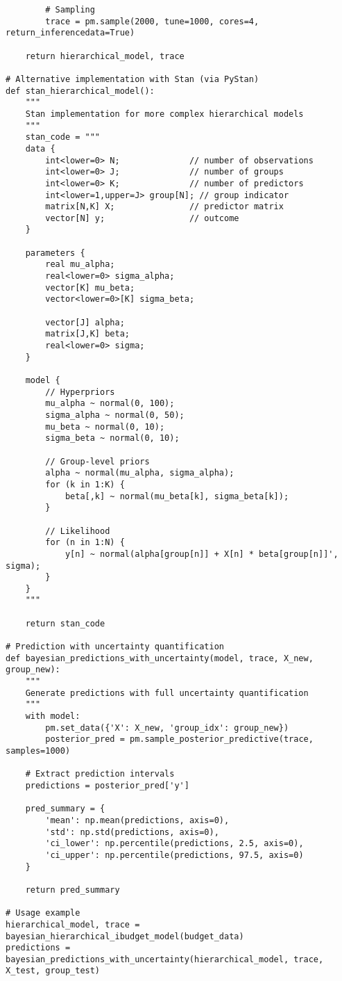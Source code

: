 \begin{lstlisting}
        # Sampling
        trace = pm.sample(2000, tune=1000, cores=4, return_inferencedata=True)
    
    return hierarchical_model, trace

# Alternative implementation with Stan (via PyStan)
def stan_hierarchical_model():
    """
    Stan implementation for more complex hierarchical models
    """
    stan_code = """
    data {
        int<lower=0> N;              // number of observations
        int<lower=0> J;              // number of groups
        int<lower=0> K;              // number of predictors
        int<lower=1,upper=J> group[N]; // group indicator
        matrix[N,K] X;               // predictor matrix
        vector[N] y;                 // outcome
    }
    
    parameters {
        real mu_alpha;
        real<lower=0> sigma_alpha;
        vector[K] mu_beta;
        vector<lower=0>[K] sigma_beta;
        
        vector[J] alpha;
        matrix[J,K] beta;
        real<lower=0> sigma;
    }
    
    model {
        // Hyperpriors
        mu_alpha ~ normal(0, 100);
        sigma_alpha ~ normal(0, 50);
        mu_beta ~ normal(0, 10);
        sigma_beta ~ normal(0, 10);
        
        // Group-level priors
        alpha ~ normal(mu_alpha, sigma_alpha);
        for (k in 1:K) {
            beta[,k] ~ normal(mu_beta[k], sigma_beta[k]);
        }
        
        // Likelihood
        for (n in 1:N) {
            y[n] ~ normal(alpha[group[n]] + X[n] * beta[group[n]]', sigma);
        }
    }
    """
    
    return stan_code

# Prediction with uncertainty quantification
def bayesian_predictions_with_uncertainty(model, trace, X_new, group_new):
    """
    Generate predictions with full uncertainty quantification
    """
    with model:
        pm.set_data({'X': X_new, 'group_idx': group_new})
        posterior_pred = pm.sample_posterior_predictive(trace, samples=1000)
    
    # Extract prediction intervals
    predictions = posterior_pred['y']
    
    pred_summary = {
        'mean': np.mean(predictions, axis=0),
        'std': np.std(predictions, axis=0),
        'ci_lower': np.percentile(predictions, 2.5, axis=0),
        'ci_upper': np.percentile(predictions, 97.5, axis=0)
    }
    
    return pred_summary

# Usage example
hierarchical_model, trace = bayesian_hierarchical_ibudget_model(budget_data)
predictions = bayesian_predictions_with_uncertainty(hierarchical_model, trace, X_test, group_test)
\end{lstlisting}

